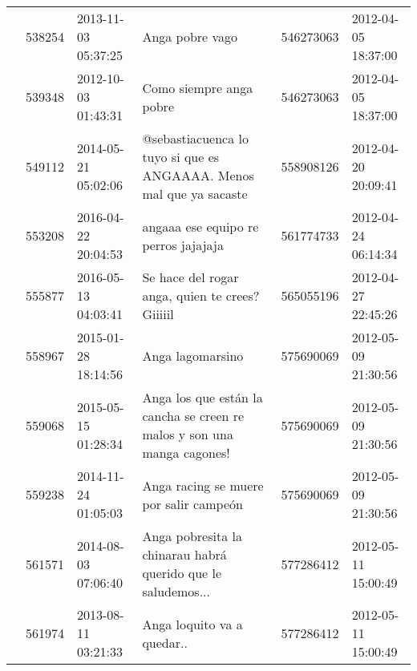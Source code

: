 \begin{tabular}{llllrl}
           & 538254  & 2013-11-03 05:37:25 &                                                                                                                              Anga pobre vago &   546273063 & 2012-04-05 18:37:00 \\
           & 539348  & 2012-10-03 01:43:31 &                                                                                                                      Como siempre anga pobre &   546273063 & 2012-04-05 18:37:00 \\
           & 549112  & 2014-05-21 05:02:06 &                                                                          @sebastiacuenca lo tuyo si que es ANGAAAA. Menos mal que ya sacaste &   558908126 & 2012-04-20 20:09:41 \\
           & 553208  & 2016-04-22 20:04:53 &                                                                                                         angaaa ese equipo re perros jajajaja &   561774733 & 2012-04-24 06:14:34 \\
           & 555877  & 2016-05-13 04:03:41 &                                                                                             Se hace del rogar anga, quien te crees? Giiiiil🖕 &   565055196 & 2012-04-27 22:45:26 \\
           & 558967  & 2015-01-28 18:14:56 &                                                                                                                             Anga lagomarsino &   575690069 & 2012-05-09 21:30:56 \\
           & 559068  & 2015-05-15 01:28:34 &                                                                      Anga los que están la cancha se creen re malos y son una manga cagones! &   575690069 & 2012-05-09 21:30:56 \\
           & 559238  & 2014-11-24 01:05:03 &                                                                                                       Anga racing se muere por salir campeón &   575690069 & 2012-05-09 21:30:56 \\
           & 561571  & 2014-08-03 07:06:40 &                                                                                 Anga pobresita la chinarau habrá querido que le saludemos... &   577286412 & 2012-05-11 15:00:49 \\
           & 561974  & 2013-08-11 03:21:33 &                                                                                                                   Anga loquito va a quedar.. &   577286412 & 2012-05-11 15:00:49 \\

\end{tabular}
